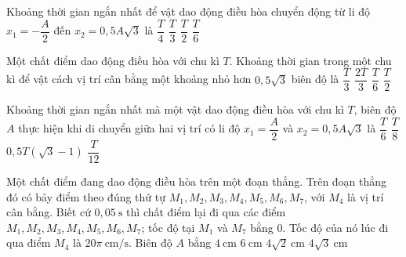 \begin{ex}
Khoảng thời gian ngắn nhất để vật dao động điều hòa chuyển động từ li độ $x_1=-\dfrac{A}{2}$ đến $x_2=0,5A\sqrt{3}$ là
\choice
{\True $\dfrac{T}{4}$}
{$\dfrac{T}{3}$}
{$\dfrac{T}{2}$}
{$\dfrac{T}{6}$}
\end{ex}

\begin{ex}
Một chất điểm dao động điều hòa với chu kì $T$. Khoảng thời gian trong một chu kì để vật cách vị trí cân bằng một khoảng nhỏ hơn $0,5\sqrt{3}$ biên độ là
\choice
{$\dfrac{T}{3}$}
{\True $\dfrac{2T}{3}$}
{$\dfrac{T}{6}$}
{$\dfrac{T}{2}$}
\end{ex}

\begin{ex}
Khoảng thời gian ngắn nhất mà một vật dao động điều hòa với chu kì $T$, biên độ $A$ thực hiện khi di chuyển giữa hai vị trí có li độ $x_1=\dfrac{A}{2}$ và $x_2=0,5A\sqrt{3}$ là
\choice
{$\dfrac{T}{6}$}
{$\dfrac{T}{8}$}
{$0,5T(\sqrt{3}-1)$}
{\True $\dfrac{T}{12}$}
\end{ex}

\begin{ex}
Một chất điểm đang dao động điều hòa trên một đoạn thẳng. Trên đoạn thẳng đó có bảy điểm theo đúng thứ tự $M_1,M_2,M_3,M_4,M_5,M_6,M_7$, với $M_4$ là vị trí cân bằng. Biết cứ $0,05\ \text{s}$ thì chất điểm lại đi qua các điểm $M_1,M_2,M_3,M_4,M_5,M_6,M_7$; tốc độ tại $M_1$ và $M_7$ bằng $0$. Tốc độ của nó lúc đi qua điểm $M_4$ là $20\pi\ \text{cm/s}$. Biên độ $A$ bằng
\choice
{$4\ \text{cm}$}
{\True $6\ \text{cm}$}
{$4\sqrt{2}\ \text{cm}$}
{$4\sqrt{3}\ \text{cm}$}
\end{ex}

